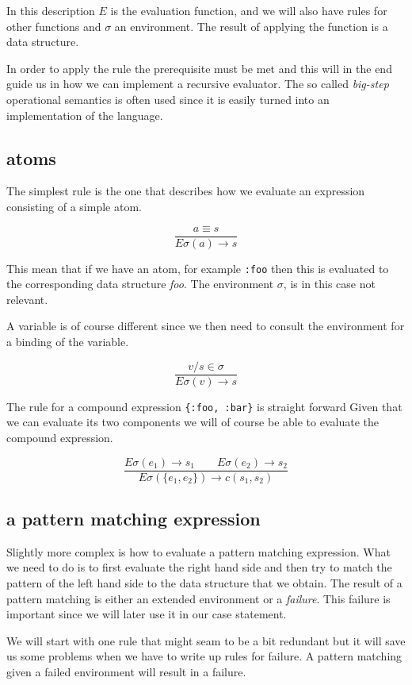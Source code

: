 \documentclass[a4paper,11pt]{article}
\begin{document}
In this description $E$ is the evaluation function, and we will also
have rules for other functions and $\sigma$ an environment. The result
of applying the function is a data structure.

In order to apply the rule the prerequisite must be met and this will
in the end guide us in how we can implement a recursive evaluator. The
so called {\em big-step} operational semantics is often used since it
is easily turned into an implementation of the language.

\subsection{atoms}

The simplest rule is the one that describes how we evaluate an
expression consisting of a simple atom.

$$\frac{a \equiv s}{E\sigma(a) \rightarrow s}$$  

This mean that if we have an atom, for example {\tt :foo} then this is
evaluated to the corresponding data structure {\em foo}. The
environment $\sigma$, is in this case not relevant. 

A variable is of course different since we then need to consult the
environment for a binding of the variable.

   $$\frac{v/s \in \sigma}{E\sigma(v) \rightarrow s}$$

The rule for a compound expression {\tt \{:foo, :bar\}} is straight
forward Given that we can evaluate its two components we will of
course be able to evaluate the compound expression.

$$\frac{ E\sigma(e_1) \rightarrow s_1 \qquad   E\sigma(e_2) \rightarrow s_2}{E\sigma(\lbrace e_1 , e_2\rbrace) \rightarrow c(s_1, s_2)}$$

\subsection{a pattern matching expression}

Slightly more complex is how to evaluate a pattern matching
expression. What we need to do is to first evaluate the right hand
side and then try to match the pattern of the left hand side to the
data structure that we obtain. The result of a pattern matching is
either an extended environment or a {\em failure}. This failure is
important since we will later use it in our case statement.

We will start with one rule that might seam to be a bit redundant but
it will save us some problems when we have to write up rules for
failure. A pattern matching given a failed environment will result in
a failure.
\end{document}
